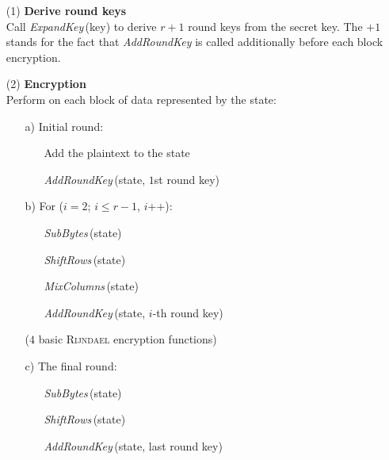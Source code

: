 \documentclass[a4paper,11pt]{article}
\begin{document}
\begin{otherlanguage}{english}
\begin{itemize} [noitemsep, nolistsep]
\item[(1)] \textbf{Derive round keys}\\
Call \textit{ExpandKey}\,(key) to derive $r+1$ round keys from the secret key. The $+ 1$ stands for the fact that \textit{Add\-RoundKey} is called additionally before each block encryption. 
\vspace{0.1cm}
\item[(2)] \textbf{Encryption}\\
Perform on each block of data represented by the \glqq state\grqq: 
\vspace{0.1cm}
  \begin{itemize} [noitemsep, nolistsep]
    \item[a)] Initial round:
      \begin{itemize} [noitemsep, nolistsep]
        \item[] Add the plaintext to the state 
        \item[] \textit{AddRoundKey}\,(state, $1$st round key)
      \end{itemize} 
    \vspace{0.1cm}
    \item[b)] For ($i=2$; $i\leq r-1$, $i$++):
    \vspace{0.1cm}
    \begin{itemize} [noitemsep, nolistsep]
        \item[] \textit{SubBytes}\,(state) 
        \item[] \textit{ShiftRows}\,(state) 
        \item[] \textit{MixColumns}\,(state) 
        \item[] \textit{AddRoundKey}\,(state, $i$-th round key) 
    \end{itemize} 
    \vspace{0.1cm}
    ($4$ basic \textsc{Rijndael} encryption functions)
    \vspace{0.1cm}
    \item[c)] The final round:
    \begin{itemize} [noitemsep, nolistsep]
        \item[] \textit{SubBytes}\,(state)
        \item[] \textit{ShiftRows}\,(state)
        \item[] \textit{AddRoundKey}\,(state, last round key) 
    \end{itemize} 
  \end{itemize}
\end{itemize}
\vspace{0.5cm}


\end{otherlanguage}
\end{document}
